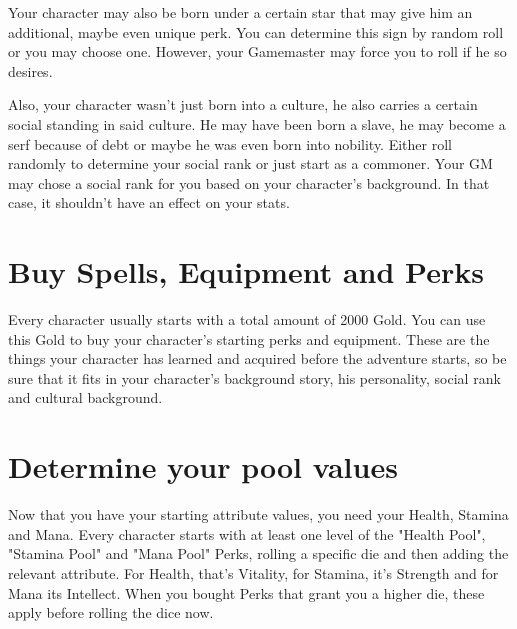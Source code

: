 Your character may also be born under a certain star that may give him an additional, maybe even unique perk. You can determine this sign by random roll or you may choose one. However, your Gamemaster may force you to roll if he so desires.

Also, your character wasn’t just born into a culture, he also carries a certain social standing in said culture. He may have been born a slave, he may become a serf because of debt or maybe he was even born into nobility. Either roll randomly to determine your social rank or just start as a commoner. Your GM may chose a social rank for you based on your character's background. In that case, it shouldn't have an effect on your stats.



\section{Buy Spells, Equipment and Perks}

Every character usually starts with a total amount of 2000 Gold. You can use this Gold to buy your character’s starting perks and equipment. These are the things your character has learned and acquired before the adventure starts, so be sure that it fits in your character’s background story, his personality, social rank and cultural background.



\section{Determine your pool values}

Now that you have your starting attribute values, you need your Health, Stamina and Mana. Every character starts with at least one level of the "Health Pool", "Stamina Pool" and "Mana Pool" Perks, rolling a specific die and then adding the relevant attribute. For Health, that’s Vitality, for Stamina, it’s Strength and for Mana its Intellect. When you bought Perks that grant you a higher die, these apply before rolling the dice now.